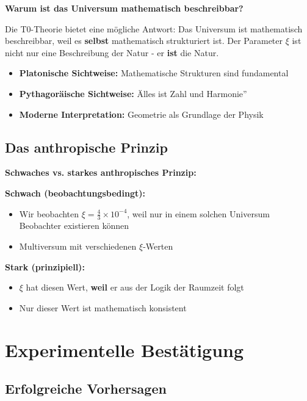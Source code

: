 \documentclass[12pt,a4paper]{article}
\begin{document}
	\begin{foundation}
		\textbf{Warum ist das Universum mathematisch beschreibbar?}
		
		Die T0-Theorie bietet eine mögliche Antwort: Das Universum ist mathematisch beschreibbar, weil es \textbf{selbst} mathematisch strukturiert ist. Der Parameter $\xi$ ist nicht nur eine Beschreibung der Natur - er \textbf{ist} die Natur.
		
		\begin{itemize}
			\item \textbf{Platonische Sichtweise:} Mathematische Strukturen sind fundamental
			\item \textbf{Pythagoräische Sichtweise:} Älles ist Zahl und Harmonie''
			\item \textbf{Moderne Interpretation:} Geometrie als Grundlage der Physik
		\end{itemize}
	\end{foundation}
	
	\subsection{Das anthropische Prinzip}
	
	\begin{alternative}
		\textbf{Schwaches vs. starkes anthropisches Prinzip:}
		
		\textbf{Schwach (beobachtungsbedingt):}
		\begin{itemize}
			\item Wir beobachten $\xi = \frac{4}{3} \times 10^{-4}$, weil nur in einem solchen Universum Beobachter existieren können
			\item Multiversum mit verschiedenen $\xi$-Werten
		\end{itemize}
		
		\textbf{Stark (prinzipiell):}
		\begin{itemize}
			\item $\xi$ hat diesen Wert, \textbf{weil} er aus der Logik der Raumzeit folgt
			\item Nur dieser Wert ist mathematisch konsistent
		\end{itemize}
	\end{alternative}
	
	\section{Experimentelle Bestätigung}
	
	\subsection{Erfolgreiche Vorhersagen}
	
\end{document}
